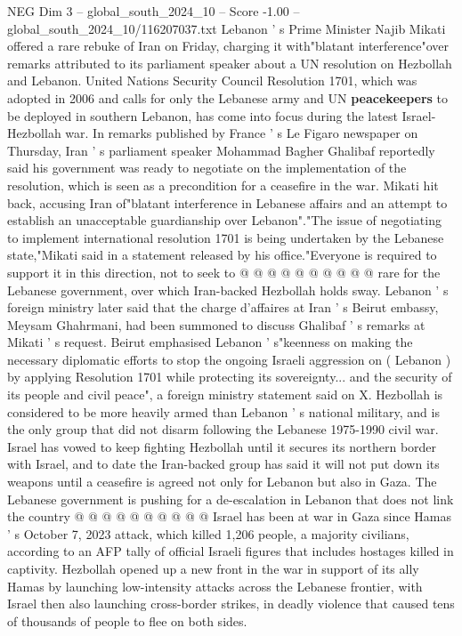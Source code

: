 \begin{textsample}{NEG Dim 3 – global\_south\_2024\_10 – Score -1.00 – global\_south\_2024\_10/116207037.txt}  \label{ex:f3_neg_059}
Lebanon ' s Prime Minister Najib Mikati offered a rare rebuke of Iran on Friday, charging it with"blatant interference"over remarks attributed to its parliament speaker about a UN resolution on Hezbollah and Lebanon.
United Nations Security Council Resolution 1701, which was adopted in 2006 and calls for only the Lebanese army and UN \textbf{peacekeepers} to be deployed in southern Lebanon, has come into focus during the latest Israel-Hezbollah war.
In remarks published by France ' s Le Figaro newspaper on Thursday, Iran ' s parliament speaker Mohammad Bagher Ghalibaf reportedly said his government was ready to negotiate on the implementation of the resolution, which is seen as a precondition for a ceasefire in the war.
Mikati hit back, accusing Iran of"blatant interference in Lebanese affairs and an attempt to establish an unacceptable guardianship over Lebanon"."The issue of negotiating to implement international resolution 1701 is being undertaken by the Lebanese state,"Mikati said in a statement released by his office."Everyone is required to support it in this direction, not to seek to @ @ @ @ @ @ @ @ @ @ rare for the Lebanese government, over which Iran-backed Hezbollah holds sway.
Lebanon ' s foreign ministry later said that the charge d'affaires at Iran ' s Beirut embassy, Meysam Ghahrmani, had been summoned to discuss Ghalibaf ' s remarks at Mikati ' s request.
Beirut emphasised Lebanon ' s"keenness on making the necessary diplomatic efforts to stop the ongoing Israeli aggression on ( Lebanon ) by applying Resolution 1701 while protecting its sovereignty... and the security of its people and civil peace", a foreign ministry statement said on X.
Hezbollah is considered to be more heavily armed than Lebanon ' s national military, and is the only group that did not disarm following the Lebanese 1975-1990 civil war.
Israel has vowed to keep fighting Hezbollah until it secures its northern border with Israel, and to date the Iran-backed group has said it will not put down its weapons until a ceasefire is agreed not only for Lebanon but also in Gaza.
The Lebanese government is pushing for a de-escalation in Lebanon that does not link the country @ @ @ @ @ @ @ @ @ @ Israel has been at war in Gaza since Hamas ' s October 7, 2023 attack, which killed 1,206 people, a majority civilians, according to an AFP tally of official Israeli figures that includes hostages killed in captivity.
Hezbollah opened up a new front in the war in support of its ally Hamas by launching low-intensity attacks across the Lebanese frontier, with Israel then also launching cross-border strikes, in deadly violence that caused tens of thousands of people to flee on both sides.

\end{textsample}
